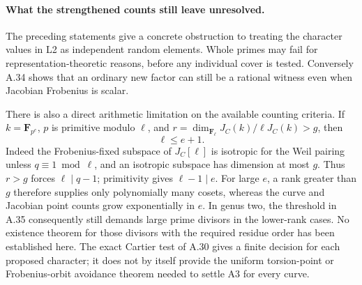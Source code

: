 \documentclass[11pt]{article}
\begin{document}
\paragraph{What the strengthened counts still leave unresolved.}
The preceding statements give a concrete obstruction to treating
the character values in L2 as independent random elements.
Whole primes may fail for representation-theoretic reasons,
before any individual cover is tested. Conversely A.34 shows
that an ordinary new factor can still be a rational witness even
when Jacobian Frobenius is scalar.

There is also a direct arithmetic limitation on the available
counting criteria. If \(k=\mathbf F_{p^e}\), \(p\) is primitive
modulo \(\ell\), and
\(r=\dim_{\mathbf F_\ell}J_C(k)/\ell J_C(k)>g\), then
\[
                         \ell\le e+1.
\]
Indeed the Frobenius-fixed subspace of \(J_C[\ell]\) is isotropic
for the Weil pairing unless \(q\equiv1\bmod\ell\), and an isotropic
subspace has dimension at most \(g\).
Thus \(r>g\) forces \(\ell\mid q-1\); primitivity gives
\(\ell-1\mid e\).
For large \(e\), a rank greater than \(g\) therefore supplies
only polynomially many cosets, whereas the curve and Jacobian
point counts grow exponentially in \(e\).
In genus two, the threshold in A.35 consequently still demands
large prime divisors in the lower-rank cases.
No existence theorem for those divisors with the required
residue order has been established here.
The exact Cartier test of A.30 gives a finite decision for
each proposed character; it does not by itself provide the
uniform torsion-point or Frobenius-orbit avoidance theorem
needed to settle A3 for every curve.
\end{document}
